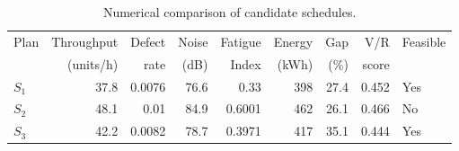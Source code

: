 \begin{table}[htbp]
\centering
\caption{Numerical comparison of candidate schedules.}
\label{tab:numerical-sim}
\small
\begin{tabular}{@{}lrrrrrrrl@{}}
\toprule
Plan & Throughput & Defect & Noise & Fatigue & Energy & Gap & V/R & Feasible \\
     & (units/h)  & rate   & (dB)  & Index   & (kWh)  & (\%) & score &         \\
\midrule
$S_{1}$ & 37.8 & 0.0076 & 76.6 & 0.33 & 398 & 27.4 & 0.452 & Yes \\
$S_{2}$ & 48.1 & 0.01 & 84.9 & 0.6001 & 462 & 26.1 & 0.466 & No \\
$S_{3}$ & 42.2 & 0.0082 & 78.7 & 0.3971 & 417 & 35.1 & 0.444 & Yes \\
\bottomrule
\end{tabular}
\end{table}
